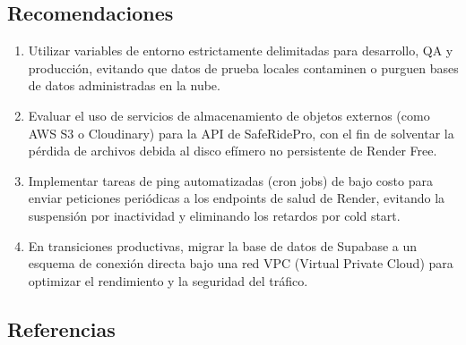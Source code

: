\documentclass{article}
\begin{document}
\subsection{Recomendaciones}
\begin{enumerate}[leftmargin=*,noitemsep]
    \item Utilizar variables de entorno estrictamente delimitadas para desarrollo, QA y producción, evitando que datos de prueba locales contaminen o purguen bases de datos administradas en la nube.
    \item Evaluar el uso de servicios de almacenamiento de objetos externos (como AWS S3 o Cloudinary) para la API de SafeRidePro, con el fin de solventar la pérdida de archivos debida al disco efímero no persistente de Render Free.
    \item Implementar tareas de ping automatizadas (cron jobs) de bajo costo para enviar peticiones periódicas a los endpoints de salud de Render, evitando la suspensión por inactividad y eliminando los retardos por cold start.
    \item En transiciones productivas, migrar la base de datos de Supabase a un esquema de conexión directa bajo una red VPC (Virtual Private Cloud) para optimizar el rendimiento y la seguridad del tráfico.
\end{enumerate}

\subsection{Referencias}
\vspace{-3em}
\renewcommand{\refname}{}



\vfill
\end{document}

